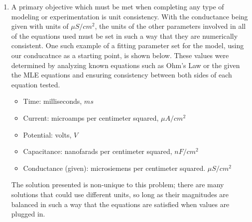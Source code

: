 \documentclass[10pt]{report}
\begin{document}
\begin{enumerate}
%
%
\item A primary objective which must be met when completing any type of modeling or experimentation is unit consistency. With the conductance being given with units of $\mu S/cm^2$, the units of the other parameters involved in all of the equations used must be set in such a way that they are numerically consistent. One such example of a fitting parameter set for the model, using our conducatnce as a starting point, is shown below. These values were determined by analyzing known equations such as Ohm's Law or the given the MLE equations and ensuring consistency between both sides of each equation tested.
\begin{itemize}
\item Time: milliseconds, $ms$
\item Current: microamps per centimeter squared, $\mu A/cm^2$
\item Potential: volts, $V$
\item Capacitance: nanofarads per centimeter squared, $nF/cm^2$
\item Conductance (given): microsiemens per centimeter squared. $\mu S/cm^2$
\end{itemize}
The solution presented is non-unique to this problem; there are many solutions that could use different units, so long as their magnitudes are balanced in such a way that the equations are satisfied when values are plugged in.
%
%

\end{enumerate}
\end{document}
